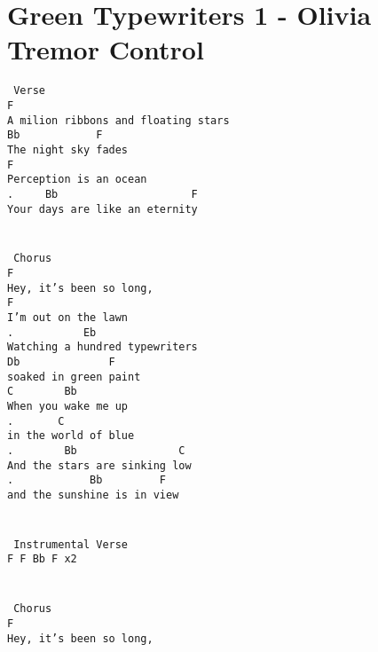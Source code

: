 \newpage
\section{Green Typewriters 1 - Olivia Tremor Control}
\label{Green Typewriters 1 - Olivia Tremor Control}
\texttt{\lbrack\ Verse\rbrack\\
F\\
A\ milion\ ribbons\ and\ floating\ stars\\
Bb\ \ \ \ \ \ \ \ \ \ \ \ F\\
The\ night\ sky\ fades\\
F\\
Perception\ is\ an\ ocean\\
.\ \ \ \ \ Bb\ \ \ \ \ \ \ \ \ \ \ \ \ \ \ \ \ \ \ \ \ F\\
Your\ days\ are\ like\ an\ eternity\\
\\
\\
\lbrack\ Chorus\rbrack\\
F\\
Hey,\ it's\ been\ so\ long,\\
F\\
I'm\ out\ on\ the\ lawn\\
.\ \ \ \ \ \ \ \ \ \ \ Eb\\
Watching\ a\ hundred\ typewriters\\
Db\ \ \ \ \ \ \ \ \ \ \ \ \ \ F\\
soaked\ in\ green\ paint\\
C\ \ \ \ \ \ \ \ Bb\\
When\ you\ wake\ me\ up\\
.\ \ \ \ \ \ \ C\\
in\ the\ world\ of\ blue\\
.\ \ \ \ \ \ \ \ Bb\ \ \ \ \ \ \ \ \ \ \ \ \ \ \ \ C\\
And\ the\ stars\ are\ sinking\ low\\
.\ \ \ \ \ \ \ \ \ \ \ \ Bb\ \ \ \ \ \ \ \ \ F\\
and\ the\ sunshine\ is\ in\ view\\
\\
\\
\lbrack\ Instrumental\ Verse\rbrack\\
F\ F\ Bb\ F\ x2\\
\\
\\
\lbrack\ Chorus\rbrack\\
F\\
Hey,\ it's\ been\ so\ long,\\
}
